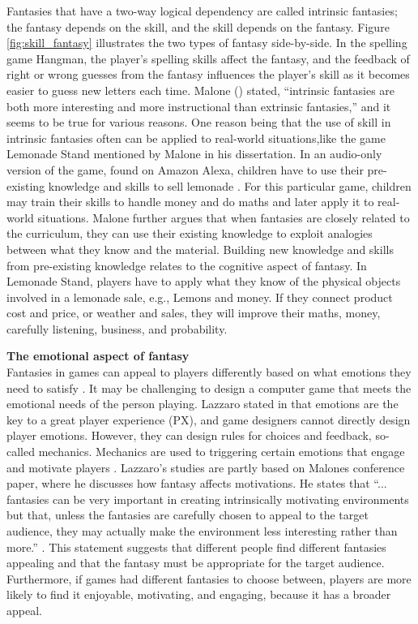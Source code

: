\documentclass[../Main.tex]{subfiles}
\begin{document}
Fantasies that have a two-way logical dependency are called intrinsic fantasies; the fantasy depends on the skill, and the skill depends on the fantasy. Figure \ref{fig:skill_fantasy} illustrates the two types of fantasy side-by-side. In the spelling game Hangman, the player’s spelling skills affect the fantasy, and the feedback of right or wrong guesses from the fantasy influences the player's skill as it becomes easier to guess new letters each time. Malone (\citeyear{malone_what_1980-1}) stated, “intrinsic fantasies are both more interesting and more instructional than extrinsic fantasies,” and it seems to be true for various reasons. One reason being that the use of skill in intrinsic fantasies often can be applied to real-world situations,like the game Lemonade Stand mentioned by Malone in his \citeyear{malone_what_1980-1} dissertation. In an audio-only version of the game, found on Amazon Alexa, children have to use their pre-existing knowledge and skills to sell lemonade \citep{einhorn_amazoncom_2019}. For this particular game, children may train their skills to handle money and do maths and later apply it to real-world situations. Malone further argues that when fantasies are closely related to the curriculum, they can use their existing knowledge to exploit analogies between what they know and the material. Building new knowledge and skills from pre-existing knowledge relates to the cognitive aspect of fantasy. In Lemonade Stand, players have to apply what they know of the physical objects involved in a lemonade sale, e.g., Lemons and money. If they connect product cost and price, or weather and sales, they will improve their maths, money, carefully listening, business, and probability.

\textbf{The emotional aspect of fantasy} \\
Fantasies in games can appeal to players differently based on what emotions they need to satisfy \citeyear{malone_what_1980-1}. It may be challenging to design a computer game that meets the emotional needs of the person playing. Lazzaro stated in  \citeyear{lazzaro_four_2008} that emotions are the key to a great player experience (PX), and game designers cannot directly design player emotions. However, they can design rules for choices and feedback, so-called mechanics. Mechanics are used to triggering certain emotions that engage and motivate players \citep{lazzaro_four_2008}. Lazzaro’s studies are partly based on Malones \citeyear{malone_heuristics_1982} conference paper, where he discusses how fantasy affects motivations. He states that “... fantasies can be very important in creating intrinsically motivating environments but that, unless the fantasies are carefully chosen to appeal to the target audience, they may actually make the environment less interesting rather than more.” \citep{malone_heuristics_1982}. This statement suggests that different people find different fantasies appealing and that the fantasy must be appropriate for the target audience. Furthermore, if games had different fantasies to choose between, players are more likely to find it enjoyable, motivating, and engaging, because it has a broader appeal.
\end{document}
